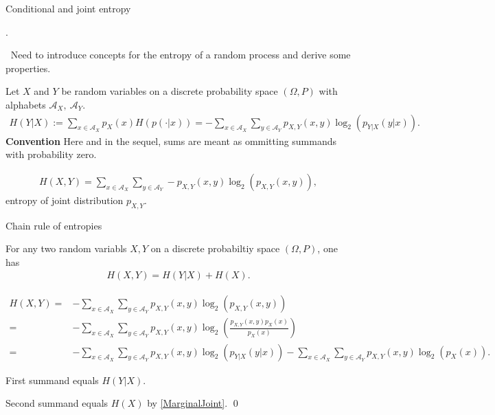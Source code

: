 \begin{frame}{Conditional and joint entropy}

.

\iarrow$\:$ Need to introduce concepts for the entropy of a random process and derive some properties. 

\vskip 4pt 
Let $X$ and $Y$ be random variables on a discrete probability space $(\Omega,P)$ with alphabets $\mathcal{A}_X,\:\mathcal{A}_Y$. 
\vskip 1pt
\begin{align*}
H(Y|X):=\sum_{x\in\mathcal{A}_X}p_X(x)H(p(\cdot|x))=-\sum_{x\in\mathcal{A}_X }\sum_{y\in\mathcal{A}_Y}p_{X,Y}(x,y)\log_2(p_{Y|X}(y|x)).
\end{align*}
\textbf{Convention} Here and in the sequel, sums are meant as ommitting summands with probability zero. 

\begin{align*}
H(X,Y)=\sum_{x\in\mathcal{A}_X}\sum_{y\in\mathcal{A}_Y}-p_{X,Y}(x,y)\log_2(p_{X,Y}(x,y)),
\end{align*}
entropy of joint distribution $p_{X,Y}$.
\end{frame}


\begin{frame}{Chain rule of entropies}
\begin{proposition}
For any two random variabls $X,Y$ on a discrete probabiltiy space $(\Omega,P)$, one has 
\begin{align*}
H(X,Y)=H(Y|X)+H(X).
\end{align*}
\end{proposition}
\begin{align*}
H(X,Y)=&-\sum_{x\in \mathcal{A}_X}\sum_{y\in\mathcal{A}_Y}p_{X,Y}(x,y)\log_2\left(p_{X,Y}(x,y)\right)\\
=&-\sum_{x\in \mathcal{A}_X}\sum_{y\in\mathcal{A}_Y}p_{X,Y}(x,y)\log_2\left(\frac{p_{X,Y}(x,y)p_X(x)}{p_X(x)}\right)\\
=&-\sum_{x\in \mathcal{A}_X}\sum_{y\in\mathcal{A}_Y}p_{X,Y}(x,y)\log_2\left(p_{Y|X}(y|x)\right)-\sum_{x\in \mathcal{A}_X}\sum_{y\in\mathcal{A}_Y}p_{X,Y}(x,y)\log_2(p_X(x)).
\end{align*}
\smallskip
\bit 
\item First summand equals $H(Y|X)$.
\item Second summand equals $H(X)$ by \eqref{MarginalJoint}. \qed
\eit 
\end{frame}







